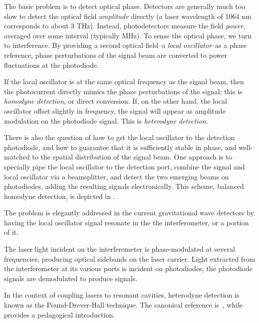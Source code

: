 \label{chapter3}
\doublespace
{}

The basic problem is to detect optical phase.  Detectors are generally
much too slow to detect the optical field \emph{amplitude} directly (a
laser wavelength of 1064 nm corresponds to about 3 THz).  Instead,
photodetectors measure the field \emph{power}, averaged over some
interval (typically MHz).  To sense the optical phase, we turn to
interference.  By providing a second optical field--a \emph{local
  oscillator}--as a phase reference, phase perturbations of the signal
beam are converted to power fluctuations at the photodiode.  

If the local oscillator is at the same optical frequency as the signal
beam, then the photocurrent directly mimics the phase perturbations of
the signal; this is \emph{homodyne detection}, or direct conversion.
If, on the other hand, the local oscillator offset slightly in
frequency, the signal will appear as amplitude modulation on the
photodiode signal.  This is \emph{heterodyne detection}.

There is also the question of how to get the local oscillator to the
detection photodiode, and how to guarantee that it is sufficiently
stable in phase, and well-matched to the spatial distribution of the
signal beam.  One approach is to specially pipe the local oscillator
to the detection port, combine the signal and local oscillator via a
beamsplitter, and detect the two emerging beams on photodiodes, adding
the resulting signals electronically.  This scheme, balanced homodyne
detection, is depicted in .

The problem is elegantly addressed in the current gravitational wave
detectors by having the local oscillator signal resonate in the the
interferometer, or a portion of it.


The laser light incident on the interferometer is phase-modulated at
several frequencies, producing optical sidebands on the laser carrier.
Light extracted from the interferometer at its various ports is
incident on photodiodes; the photodiode signals are demodulated to
produce signals.


In the context of coupling lasers to resonant cavities, heterodyne
detection is known as the Pound-Drever-Hall technique.  The canonical
reference is~\cite{Drever1983Laser}, while
\cite{Black2001Introduction} provides a pedagogical introduction.

